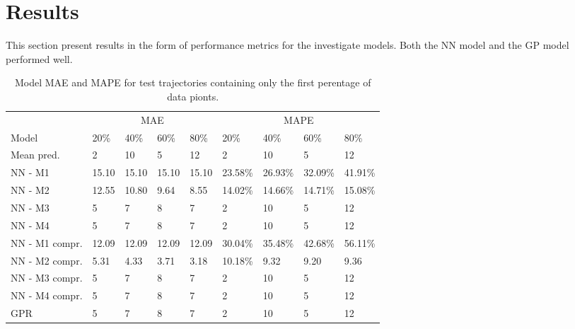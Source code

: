 
\chapter{Results}
\label{cha:results}
This section present results in the form of performance metrics for the investigate models. Both the NN model and the GP model performed well.

\begin{table}[H]
  \centering
  \caption{Model MAE and MAPE for test trajectories containing only the first perentage of data pionts.}
  \label{tbl:models-mae-and-mape}
  \begin{tabular}{l | l | l | l | l || l | l | l | l }
    & \multicolumn{4}{c}{MAE} & \multicolumn{4}{c}{MAPE} \\
    Model      & 20\% & 40\% & 60\% & 80\% & 20\% & 40\% & 60\% & 80\% \\
    \hline
    Mean pred. & 2 & 10 & 5 & 12  & 2 & 10 & 5 & 12 \\
    NN - M1        & 15.10 &  15.10 & 15.10 &  15.10  & 23.58\% & 26.93\% & 32.09\% & 41.91\% \\
    NN - M2        & 12.55 &  10.80 & 9.64 &  8.55  & 14.02\% & 14.66\% & 14.71\% & 15.08\% \\
    NN - M3        & 5 &  7 & 8 &  7  & 2 & 10 & 5 & 12 \\
    NN - M4        & 5 &  7 & 8 &  7  & 2 & 10 & 5 & 12 \\
    NN - M1 compr.        & 12.09 &  12.09 & 12.09 &  12.09  & 30.04\% & 35.48\% & 42.68\% & 56.11\% \\
    NN - M2 compr.       & 5.31 &  4.33 & 3.71 &  3.18  & 10.18\% & 9.32 & 9.20 & 9.36 \\
    NN - M3 compr.       & 5 &  7 & 8 &  7  & 2 & 10 & 5 & 12 \\
    NN - M4 compr.       & 5 &  7 & 8 &  7  & 2 & 10 & 5 & 12 \\
    GPR        & 5 &  7 & 8 &  7  & 2 & 10 & 5 & 12 \\
  \end{tabular}
\end{table}

